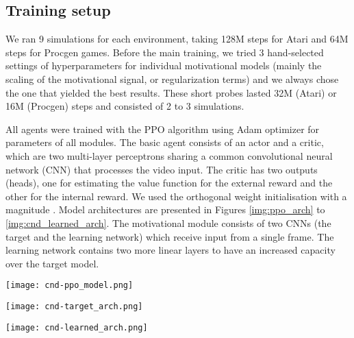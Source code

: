 \documentclass[a4paper,11pt]{elsarticle}
\begin{document}
\subsection{Training setup}

We ran 9 simulations for each environment, taking 128M steps for Atari and 64M steps for Procgen games. Before the main training, we tried 3 hand-selected settings of hyperparameters for individual motivational models (mainly the scaling of the motivational signal, or regularization terms) and we always chose the one that yielded the best results. These short probes lasted 32M (Atari) or 16M (Procgen) steps and consisted of 2 to 3 simulations. 

All agents were trained with the PPO algorithm \citep{schulman2017proximal} using Adam optimizer \citep{kingma2015adam} for parameters of all modules. The basic agent consists of an actor and a critic, which are two multi-layer perceptrons sharing a common convolutional neural network (CNN) that processes the video input. The critic has two outputs (heads), one for estimating the value function for the external reward and the other for the internal reward. We used the orthogonal weight initialisation with a magnitude . 
Model architectures are presented in Figures \ref{img:ppo_arch} to \ref{img:cnd_learned_arch}. 
The motivational module consists of two CNNs (the target and the learning network) which receive input from a single frame. The learning network contains two more linear layers to have an increased capacity over the target model. 

\begin{figure*}[t!]
\centering
\texttt{[image: cnd-ppo\_model.png]}
\caption{The PPO agent model architecture.}
\label{img:ppo_arch}
\end{figure*}
\begin{figure*}[t!]
\centering
\texttt{[image: cnd-target\_arch.png]}
\caption{The target model architecture.}
\label{img:cnd_target_arch}
\end{figure*}
\begin{figure*}[t!]
\centering
\texttt{[image: cnd-learned\_arch.png]}
\caption{The learning model architecture.}
\label{img:cnd_learned_arch}
\end{figure*}
\end{document}
